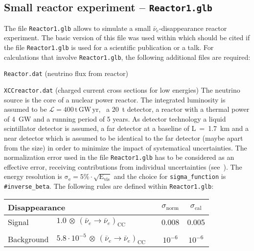\begin{appendix}
\subsection*{Small reactor experiment -- {\tt Reactor1.glb}}

The file {\tt Reactor1.glb} allows to simulate a small $\bar{\nu}_e$-disappearance reactor experiment. The basic
version of this file was used within \cite{Huber:2003pm} which should be cited if the file {\tt Reactor1.glb} is
used for a scientific publication or a talk. For calculations that involve {\tt Reactor1.glb}, the following
additional files are required:
\bi
\item {\tt Reactor.dat} (neutrino flux from reactor)
\item {\tt XCCreactor.dat} (charged current cross sections for low energies)
\ei
The neutrino source is the core of a nuclear power reactor. The integrated luminosity is assumed to be
$\mathrm{\mathcal{L} = 400 \,t \, GW\, yr}$, \eg\ a 20~t detector, a reactor with a thermal power of 4~GW
and a running period of 5 years. As detector technology a liquid scintillator 
detector is assumed, a far detector at a baseline of L~=~1.7~km and a near detector which is
assumed to be identical to the far detector (maybe apart from the size) in order to minimize the impact of systematical uncertainties. The normalization error
used in the file {\tt Reactor1.glb} has to be considered as an effective error, receiving contributions from
individual uncertainties (see~\cite{Huber:2003pm}). The energy resolution is
$\mathrm{\sigma_e=5\%\cdot\sqrt{E_{vis}}}$ and the choice for {\tt sigma\_function} is {\tt \#inverse\_beta}. The following rules are defined within {\tt Reactor1.glb}: 
\begin{center}
\begin{tabular}{|l|ll|c|c|}
\hline \hline
\multicolumn{3}{|l|}{Disappearance} & $\sigma_\mathrm{norm}$ & $\sigma_\mathrm{cal}$ \\ \hline 
Signal & $1.0 \, \otimes \, (\bar{\nu}_e\rightarrow\bar{\nu}_e)_{\mathrm{CC}}$ & \hspace{5.5cm} & 0.008 & 0.005\\
 & &  & &\\
Background & $5.8\cdot 10^{-5} \, \otimes \, (\bar{\nu}_e\rightarrow\bar{\nu}_e)_\mathrm{CC}$ & \hspace{5.5cm} &
$10^{-6}$ & $10^{-6}$ \\ \hline \hline 
\end{tabular}
\end{center}


\end{appendix}
